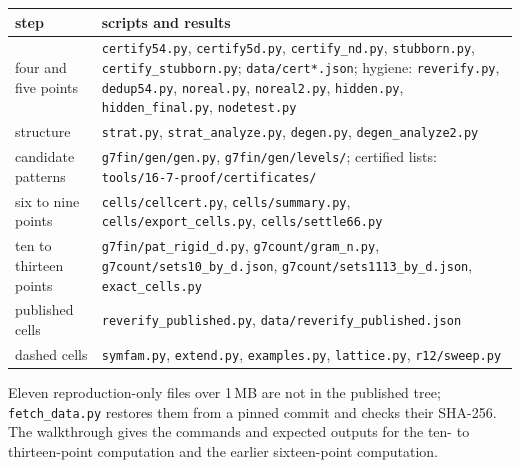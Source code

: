 \documentclass[11pt]{amsart}
\theoremstyle{remark}
\begin{document}
\begin{center}
\begin{tabular}{@{}lp{}@{}}
\toprule
step & scripts and results\\
\midrule
four and five points & \texttt{certify54.py}, \texttt{certify5d.py}, \texttt{certify\_nd.py}, \texttt{stubborn.py}, \texttt{certify\_stubborn.py};
  \texttt{data/cert*.json}; hygiene: \texttt{reverify.py}, \texttt{dedup54.py}, \texttt{noreal.py},
  \texttt{noreal2.py}, \texttt{hidden.py}, \texttt{hidden\_final.py}, \texttt{nodetest.py}\\
structure & \texttt{strat.py}, \texttt{strat\_analyze.py}, \texttt{degen.py}, \texttt{degen\_analyze2.py}\\
candidate patterns & \texttt{g7fin/gen/gen.py}, \texttt{g7fin/gen/levels/}; certified lists:
  \texttt{tools/16-7-proof/certificates/}\\
six to nine points & \texttt{cells/cellcert.py}, \texttt{cells/summary.py}, \texttt{cells/export\_cells.py},
  \texttt{cells/settle66.py}\\
ten to thirteen points & \texttt{g7fin/pat\_rigid\_d.py}, \texttt{g7count/gram\_n.py},
  \texttt{g7count/sets10\_by\_d.json}, \texttt{g7count/sets1113\_by\_d.json}, \texttt{exact\_cells.py}\\
published cells & \texttt{reverify\_published.py}, \texttt{data/reverify\_published.json}\\
dashed cells & \texttt{symfam.py}, \texttt{extend.py}, \texttt{examples.py}, \texttt{lattice.py},
  \texttt{r12/sweep.py}\\
\bottomrule
\end{tabular}
\end{center}

\noindent Eleven reproduction-only files over 1\,MB are not in the published tree; \texttt{fetch\_data.py}
restores them from a pinned commit and checks their SHA-256. The walkthrough \cite{repro} gives the
commands and expected outputs for the ten- to thirteen-point computation and the earlier sixteen-point
computation.
\end{document}
